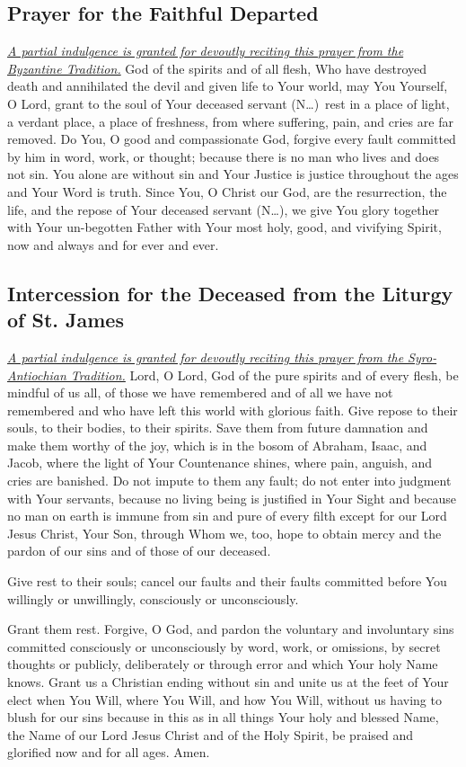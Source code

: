 \documentclass[12pt]{article}
\newcommand{\prayertitle}[1]{\subsection{#1}}
\newcommand{\indulgencedprayertitle}[1]{\prayertitle{#1 \protect\kreuz}}
\newcommand{\insertname}{(N\dots)\xspace}
\newcommand{\emphasis}[1]{\emph{#1}}
\newcommand{\emphasis}[1]{\textsl{#1}}
\newcommand{\note}[1]{{\small{\emphasis{#1}}}\newline}
\newcommand{\linkednote}[2]{\hyperlink{#1}{\note{#2}}}
\begin{document}
\indulgencedprayertitle{Prayer for the Faithful Departed}
\linkednote{grant23}{A partial indulgence is granted for devoutly reciting this prayer from the Byzantine Tradition.}
God of the spirits and of all flesh, Who have destroyed death and annihilated the devil
and given life to Your world, may You Yourself, O Lord, grant to the soul of Your
deceased servant \insertname\ rest in a place of light, a verdant place, a place of freshness, from where suffering, pain, and cries are far removed.
Do You, O good and compassionate God, forgive every fault committed by him in word, work, or thought;
because there is no man who lives and does not sin.
You alone are without sin and Your Justice is justice throughout the ages and Your Word is truth.
Since You, O Christ our God, are the resurrection, the life, and the repose of Your
deceased servant \insertname, we give You glory together with Your un-begotten Father with
Your most holy, good, and vivifying Spirit, now and always and for ever and ever.

\indulgencedprayertitle{Intercession for the Deceased from the Liturgy of St. James}
\linkednote{grant23}{A partial indulgence is granted for devoutly reciting this prayer from the Syro-Antiochian Tradition.}
Lord, O Lord, God of the pure spirits and of every flesh, be mindful of us all, of those we have remembered and of all we have not remembered and who have left this world with glorious faith.
Give repose to their souls, to their bodies, to their spirits.
Save them from future damnation and make them worthy of the joy, which is in the bosom of Abraham, Isaac, and Jacob, where the light of Your Countenance shines, where pain, anguish, and cries are banished.
Do not impute to them any fault;
do not enter into judgment with Your servants, because no living being is justified in Your Sight and because no man on earth is immune from sin and pure of every filth except for our Lord Jesus Christ, Your Son, through Whom we, too, hope to obtain mercy and the pardon of our sins and of those of our deceased.

Give rest to their souls;
cancel our faults and their faults committed before You willingly or unwillingly, consciously or unconsciously.

Grant them rest.
Forgive, O God, and pardon the voluntary and involuntary sins committed consciously or unconsciously by word, work, or omissions, by secret thoughts or publicly, deliberately or through error and which Your holy Name knows.
Grant us a Christian ending without sin and unite us at the feet of Your elect when You Will, where You Will, and how You Will, without us having to blush for our sins because in this as in all things Your holy and blessed Name, the Name of our Lord Jesus Christ and of the Holy Spirit, be praised and glorified now and for all ages. Amen.
\end{document}
